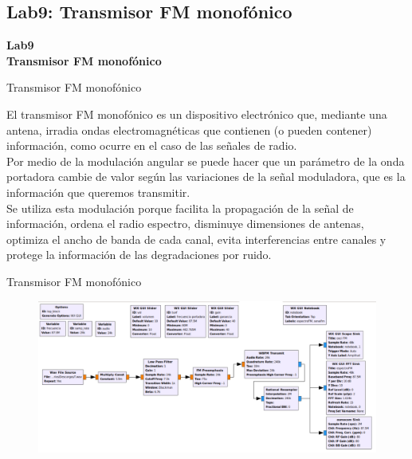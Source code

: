 \subsection{Lab9: Transmisor FM monofónico}

\begin{frame}{}


\bfseries{\textrm{\LARGE Lab9\\ \Large Transmisor FM monofónico}}
\raggedright
\end{frame}

\begin{frame}{Transmisor FM monofónico}


El transmisor FM monofónico es un dispositivo electrónico que, mediante una antena, irradia ondas electromagnéticas que contienen (o pueden contener) información, como ocurre en el caso de las señales de radio.\\ \vspace{2mm}
Por medio de la modulación angular se puede hacer que un parámetro de la onda portadora cambie de valor según las variaciones de la señal moduladora, que es la información que queremos transmitir. \\ \vspace{2mm}
Se utiliza esta modulación porque facilita la propagación de la señal de información, ordena el radio espectro, disminuye dimensiones de antenas, optimiza el ancho de banda de cada canal, evita interferencias entre canales y protege la información de las degradaciones por ruido.



\end{frame}
\begin{frame}{Transmisor FM monofónico}

\begin{figure}[H]
\centering
\vspace{-3mm}
\includegraphics[width=\textwidth]{parte3/lab11/pdf/lab11_1.pdf}
\end{figure}

\end{frame}

